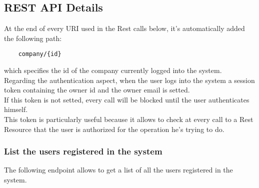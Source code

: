 \subsection{REST API Details}
At the end of every URI used in the Rest calls below, it's automatically added the following path: 
\begin{lstlisting}
    company/{id}
\end{lstlisting}
which specifies the id of the company currently logged into the system. \\
Regarding the authentication aspect, when the user logs into the system a session token containing the owner id and the owner email is setted. \\
If this token is not setted, every call will be blocked until the user authenticates himself. \\
This token is particularly useful because it allows to check at every call to a Rest Resource that the user is authorized for the operation he's trying to do. \\



\subsubsection*{List the users registered in the system}

The following endpoint allows to get a list of all the users registered in the system.

